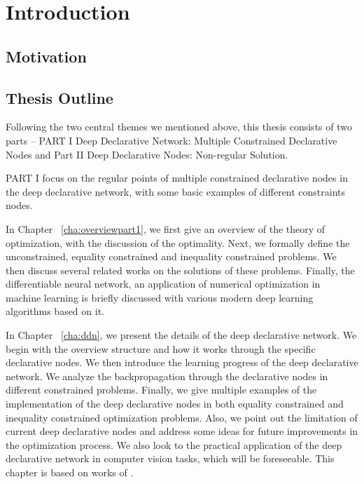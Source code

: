 \chapter{Introduction}
\label{cha:intro}

\section{Motivation}
\label{sec:motivation}




\section{Thesis Outline}
\label{sec:outline}
Following the two central themes we mentioned above, this thesis consists of two parts -- PART I Deep Declarative Network: Multiple Constrained Declarative Nodes and Part II Deep Declarative Nodes: Non-regular Solution. 
\par PART I focus on the regular points of multiple constrained declarative nodes in the deep declarative network, with some basic examples of different constraints nodes. 
\begin{description}
    \item In Chapter ~\ref{cha:overviewpart1}, we first give an overview of the theory of optimization, with the discussion of the optimality. Next, we formally define the unconstrained, equality constrained and inequality constrained problems. We then discuss several related works on the solutions of these problems. Finally, the differentiable neural network, an application of numerical optimization in machine learning is briefly discussed with various modern deep learning algorithms based on it. 
    \item In Chapter ~\ref{cha:ddn}, we present the details of the deep declarative network. We begin with the overview structure and how it works through the specific declarative nodes. We then introduce the learning progress of the deep declarative network. We analyze the backpropagation through the declarative nodes in different constrained problems. Finally, we give multiple examples of the implementation of the deep declarative nodes in both equality constrained and inequality constrained optimization problems. Also, we point out the limitation of current deep declarative nodes and address some ideas for future improvements in the optimization process. We also look to the practical application of the deep declarative network in computer vision tasks, which will be foreseeable. This chapter is based on works of \cite{SG:19}. 
\end{description}


